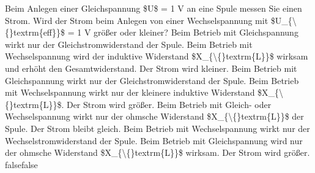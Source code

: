     {Beim Anlegen einer Gleichspannung \$U\$ = 1 V an eine Spule messen Sie einen Strom. Wird der Strom beim Anlegen von einer Wechselspannung mit \$U\_\{\textbackslash\{\}textrm\{eff\}\}\$ = 1 V größer oder kleiner?}
    {Beim Betrieb mit Gleichspannung wirkt nur der Gleichstromwiderstand der Spule. Beim Betrieb mit Wechselspannung wird der induktive Widerstand \$X\_\{\textbackslash\{\}textrm\{L\}\}\$ wirksam und erhöht den Gesamtwiderstand. Der Strom wird kleiner.}
    {Beim Betrieb mit Gleichspannung wirkt nur der Gleichstromwiderstand der Spule. Beim Betrieb mit Wechselspannung wirkt nur der kleinere induktive Widerstand \$X\_\{\textbackslash\{\}textrm\{L\}\}\$. Der Strom wird größer.}
    {Beim Betrieb mit Gleich- oder Wechselspannung wirkt nur der ohmsche Widerstand \$X\_\{\textbackslash\{\}textrm\{L\}\}\$ der Spule. Der Strom bleibt gleich.}
    {Beim Betrieb mit Wechselspannung wirkt nur der Wechselstromwiderstand der Spule. Beim Betrieb mit Gleichspannung wird nur der ohmsche Widerstand \$X\_\{\textbackslash\{\}textrm\{L\}\}\$ wirksam. Der Strom wird größer.}
    {false}{false}